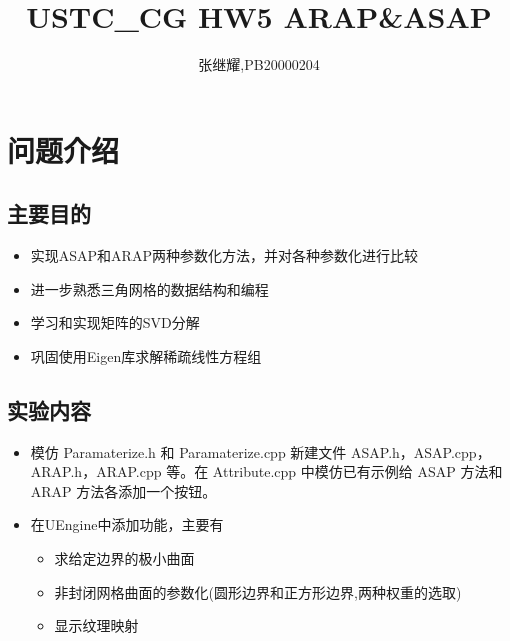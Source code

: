 \documentclass{article}
\title{USTC\_CG HW5 ARAP\&ASAP}
\author{张继耀,PB20000204}
\begin{document}
	\maketitle
	
	\tableofcontents
	
	\section {问题介绍}
	\subsection{主要目的}
	
		\begin{itemize}
		\item 实现ASAP和ARAP两种参数化方法，并对各种参数化进行比较
	\end{itemize}
	
	\begin{itemize}
	\item 进一步熟悉三角网格的数据结构和编程
	\end{itemize}
	
	\begin{itemize}
	\item 学习和实现矩阵的SVD分解
	\end{itemize}
	
	\begin{itemize}
	\item 巩固使用Eigen库求解稀疏线性方程组
	\end{itemize}

	
	\subsection{实验内容}
	
	 \begin{itemize}
		\item  模仿 Paramaterize.h 和 Paramaterize.cpp 新建文件 ASAP.h，ASAP.cpp，ARAP.h，ARAP.cpp 等。在 Attribute.cpp 中模仿已有示例给 ASAP 方法和 ARAP 方法各添加一个按钮。
	\end{itemize}

	\begin{itemize}
		\item  在UEngine中添加功能，主要有
		\begin{itemize}[label=$\circ$, itemjoin=\hspace{0.5em}]
			\item 求给定边界的极小曲面
			\item 非封闭网格曲面的参数化(圆形边界和正方形边界,两种权重的选取)
			\item 显示纹理映射
		\end{itemize}
	\end{itemize}
\end{document}
